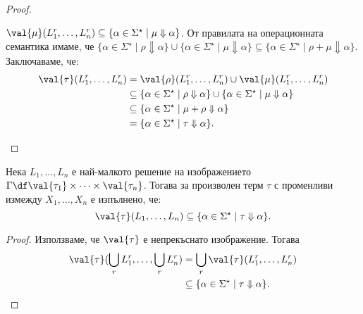 \begin{proof}
\begin{itemize}
    $\val{\mu}(L^r_1,\dots,L^r_n) \subseteq \{\alpha \in \Sigma^\star \mid \mu \Downarrow \alpha\}$.
    От правилата на операционната семантика имаме, че
    $\{\alpha \in \Sigma^\star \mid \rho \Downarrow \alpha\} \cup \{\alpha \in \Sigma^\star \mid \mu \Downarrow \alpha\} \subseteq \{\alpha \in \Sigma^\star \mid \rho + \mu \Downarrow \alpha\}$.
    Заключаваме, че:
    \begin{align*}
      \val{\tau}(L^r_1,\dots,L^r_n) & = \val{\rho}(L^r_1,\dots,L^r_n) \cup \val{\mu}(L^r_1,\dots,L^r_n)\\
                                    & \subseteq \{\alpha \in \Sigma^\star \mid \rho \Downarrow \alpha\} \cup \{\alpha \in \Sigma^\star \mid \mu \Downarrow \alpha\} \\
                                    & \subseteq \{\alpha \in \Sigma^\star \mid \mu+\rho \Downarrow \alpha\}\\
      & = \{\alpha \in \Sigma^\star \mid \tau \Downarrow \alpha\}.
    \end{align*}
  \end{itemize}
\end{proof}

\begin{corollary}
  Нека $L_1,\dots,L_n$ е най-малкото решение на изображението $\Gamma \df \val{\tau_1}\times\cdots\times\val{\tau_n}$. Тогава за произволен терм $\tau$ с променливи измежду $X_1,\dots,X_n$ е изпълнено, че:
  \[\val{\tau}(L_1,\dots,L_n) \subseteq \{\alpha \in \Sigma^\star \mid \tau \Downarrow \alpha\}.\]
\end{corollary}
\begin{proof}
  Използваме, че $\val{\tau}$ е непрекъснато изображение. Тогава
  \begin{align*}
    \val{\tau}(\bigcup_r L^r_1,\dots,\bigcup_rL^r_n) & = \bigcup_r\val{\tau}(L^r_1,\dots,L^r_n)\\
                                                     & \subseteq \{\alpha \in \Sigma^\star \mid \tau \Downarrow \alpha\}.
  \end{align*}
\end{proof}

